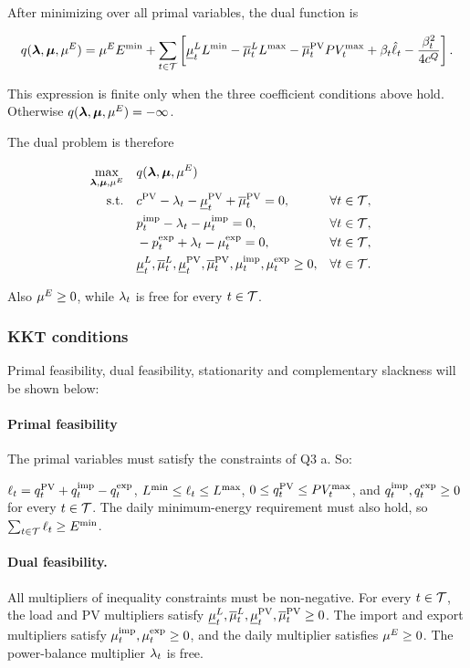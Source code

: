 After minimizing over all primal variables, the dual function is

\begin{equation}
\begin{aligned}
q(\boldsymbol{\lambda},\boldsymbol{\mu},\mu^{E})
=
\mu^{E}E^{\min}
+
\sum_{t\in\mathcal{T}}
\left[
    \underline{\mu}^{L}_{t}L^{\min}
    -\overline{\mu}^{L}_{t}L^{\max}
    -\overline{\mu}^{\mathrm{PV}}_{t}PV_{t}^{\max}
    +\beta_t\hat{\ell}_{t}
    -\frac{\beta_t^2}{4c^Q}
\right].
\end{aligned}
\label{eq:q3_dual_function}
\end{equation}

This expression is finite only when the three coefficient conditions above hold. Otherwise
$q(\boldsymbol{\lambda},\boldsymbol{\mu},\mu^{E})=-\infty$.

The dual problem is therefore

\begin{align}
\max_{\boldsymbol{\lambda},\boldsymbol{\mu},\mu^{E}}
\quad
& q(\boldsymbol{\lambda},\boldsymbol{\mu},\mu^{E})
\label{eq:q3_dual_problem} \\
\text{s.t.}\quad
& c^{\mathrm{PV}}-\lambda_{t}-\underline{\mu}^{\mathrm{PV}}_{t}+\overline{\mu}^{\mathrm{PV}}_{t}=0,
&& \forall t\in\mathcal{T}, \nonumber\\
& p^{\mathrm{imp}}_{t}-\lambda_{t}-\mu^{\mathrm{imp}}_{t}=0,
&& \forall t\in\mathcal{T}, \nonumber\\
& -p^{\mathrm{exp}}_{t}+\lambda_{t}-\mu^{\mathrm{exp}}_{t}=0,
&& \forall t\in\mathcal{T}, \nonumber\\
& \underline{\mu}^{L}_{t},\overline{\mu}^{L}_{t},\underline{\mu}^{\mathrm{PV}}_{t},\overline{\mu}^{\mathrm{PV}}_{t},\mu^{\mathrm{imp}}_{t},\mu^{\mathrm{exp}}_{t}\geq0,
&& \forall t\in\mathcal{T}. \nonumber
\end{align}

Also $\mu^{E}\geq0$, while $\lambda_{t}$ is free for every $t\in\mathcal{T}$.

\subsubsection{KKT conditions}
Primal feasibility, dual feasibility, stationarity and complementary slackness will be shown below:

\paragraph{Primal feasibility}
The primal variables must satisfy the constraints of Q3 a. So: 

$\ell_{t}=q^{\mathrm{PV}}_{t}+q^{\mathrm{imp}}_{t}-q^{\mathrm{exp}}_{t}$, $L^{\min}\leq\ell_{t}\leq L^{\max}$,
$0\leq q^{\mathrm{PV}}_{t}\leq PV_{t}^{\max}$, and $q^{\mathrm{imp}}_{t},q^{\mathrm{exp}}_{t}\geq0$ for every $t\in\mathcal{T}$.
The daily minimum-energy requirement must also hold, so
$\sum_{t\in\mathcal{T}}\ell_{t}\geq E^{\min}$.

\paragraph{Dual feasibility.}
All multipliers of inequality constraints must be non-negative. For every $t\in\mathcal{T}$,
the load and PV multipliers satisfy
$\underline{\mu}^{L}_{t},\overline{\mu}^{L}_{t},\underline{\mu}^{\mathrm{PV}}_{t},\overline{\mu}^{\mathrm{PV}}_{t}\geq0$.
The import and export multipliers satisfy $\mu^{\mathrm{imp}}_{t},\mu^{\mathrm{exp}}_{t}\geq0$, and the daily
multiplier satisfies $\mu^{E}\geq0$. The power-balance multiplier $\lambda_{t}$ is free.


